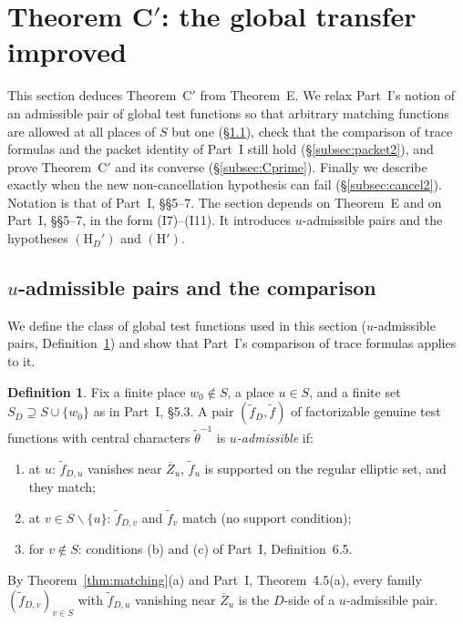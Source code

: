 \documentclass[12pt]{article}
\newcommand{\ov}[1]{\overline{#1}}
\newcommand{\Zb}{\ov{Z}}
\theoremstyle{plain}
\theoremstyle{definition}
\newtheorem{definition}[theorem]{Definition}
\begin{document}
\section{Theorem C$'$: the global transfer improved}\label{sec:CC}
This section deduces Theorem~C$'$ from Theorem~E. We relax Part~I's notion of an admissible pair of global test functions so that arbitrary matching functions are allowed at all places of $S$ but one (\S\ref{subsec:uadm}), check that the comparison of trace formulas and the packet identity of Part~I still hold (\S\ref{subsec:packet2}), and prove Theorem~C$'$ and its converse (\S\ref{subsec:Cprime}). Finally we describe exactly when the new non-cancellation hypothesis can fail (\S\ref{subsec:cancel2}). Notation is that of Part~I, \S\S5--7. The section depends on Theorem~E and on Part~I, \S\S5--7, in the form (I7)--(I11). It introduces $u$-admissible pairs and the hypotheses $(\mathrm H_D')$ and $(\mathrm H')$.

\subsection{$u$-admissible pairs and the comparison}\label{subsec:uadm}
We define the class of global test functions used in this section ($u$-admissible pairs, Definition~\ref{def:uadm}) and show that Part~I's comparison of trace formulas applies to it.

\begin{definition}\label{def:uadm}
Fix a finite place $w_0\notin S$, a place $u\in S$, and a finite set $S_D\supseteq S\cup\{w_0\}$ as in Part~I, \S5.3. A pair $(\tilde f_D,\tilde f)$ of factorizable genuine test functions with central characters $\tilde\theta^{-1}$ is \emph{$u$-admissible} if:
\begin{enumerate}[label=(\alph*)]
\item at $u$: $\tilde f_{D,u}$ vanishes near $\Zb_u$, $\tilde f_u$ is supported on the regular elliptic set, and they match;
\item at $v\in S\smallsetminus\{u\}$: $\tilde f_{D,v}$ and $\tilde f_v$ match (no support condition);
\item for $v\notin S$: conditions (b) and (c) of Part~I, Definition~6.5.
\end{enumerate}
\end{definition}

By Theorem~\ref{thm:matching}(a) and Part~I, Theorem~4.5(a), every family $(\tilde f_{D,v})_{v\in S}$ with $\tilde f_{D,u}$ vanishing near $\Zb_u$ is the $D$-side of a $u$-admissible pair.
\end{document}
